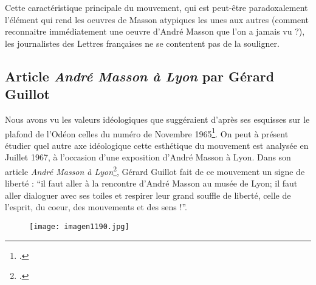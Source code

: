 	Cette caractéristique principale du mouvement, qui est peut-être paradoxalement l’élément qui rend les oeuvres de Masson atypiques les unes aux autres (comment reconnaitre immédiatement une oeuvre d’André Masson que l’on a jamais vu ?), les journalistes des Lettres françaises ne se contentent pas de la souligner. 

	\subsection{Article \emph{André Masson à Lyon} par Gérard Guillot }

 Nous avons vu les valeurs idéologiques que suggéraient d’après ses esquisses sur le plafond de l’Odéon celles du numéro de Novembre 1965\footcite{sivous}. On peut à présent étudier quel autre axe idéologique cette esthétique du mouvement est analysée en Juillet 1967, à l’occasion d’une exposition d’André Masson à Lyon. Dans son article \emph{André Masson à Lyon}\footcite{massonlyon}, Gérard Guillot fait de ce mouvement un signe de liberté : \enquote{il faut aller à la rencontre d’André Masson au musée de Lyon; il faut aller dialoguer avec ses toiles et respirer leur grand souffle de liberté, celle de l’esprit, du coeur, des mouvements et des sens !}. 

\begin{figure}[H]
   \centering
   \texttt{[image: imagen1190.jpg]}
	\caption{\cite{massonlyon}}\label{fig:MassonLyon}
\end{figure}


